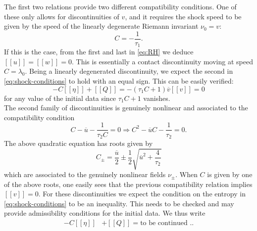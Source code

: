 \documentclass{article}
\theoremstyle{plain}
\theoremstyle{definition}
\numberwithin{theorem}{section}
\newcommand{\todo}[1]{{\Large{\color{red}{#1}}}}
\begin{document}
The first two  relations provide two different compatibility conditions.
One of these only allows for  discontinuities of $v$, and  it requires  the shock speed to be given by the speed of the linearly degenerate Riemann invariant $\nu_0=v$:
\begin{equation}
  C = - \dfrac{1}{\tau_1}.
\end{equation}
 If this is the case,   from the first and last in \eqref{eq:RH}   we deduce $[\![ u]\!] =[\![ w]\!] =0 $. This is essentially a contact discontinuity  moving at speed $C=\lambda_0$.
 Being a linearly degenerated discontinuity, we expect the second in \eqref{eq:shock-conditions} to hold with an equal sign. This can be easily verified:
\begin{equation}
-C [\![\eta ]\!]  +  [\![ Q ]\!] =  - (\tau_1 C + 1) {\overline  v }  [\![ v ]\!] = 0
\end{equation}
for any value of the initial data since $\tau_1 C + 1$ vanishes. \\

The second family of discontinuities is genuinely nonlinear and associated to the compatibility condition
\begin{equation}
C- { \overline u} -\dfrac{1}{\tau_2 C} =0 \Rightarrow   C^2 - { \overline u} C  -\dfrac{1}{\tau_2 } =0.
\end{equation}
The above quadratic equation has    roots given by
\begin{equation}
C_{\pm} = \dfrac{\overline u}{2} \pm \dfrac{1}{2} \sqrt{{\overline u}^2 +\dfrac{4}{\tau_2} }
\end{equation}
which are associated to the genuinely nonlinear fields $\nu_{\pm}$. When $C$ is given by one of the above roots, one easily sees that the previous compatibility relation implies $ [\![ v ]\!]=0$.  For these discontinuities we expect the condition on the entropy in \eqref{eq:shock-conditions} to be an inequality. This needs to be checked and may provide
admissibility conditions for the initial data. We thus write
\begin{equation}
\begin{aligned}
-C [\![\eta ]\!]  & +  [\![ Q ]\!] =  \text{to be continued ..}
\end{aligned}
\end{equation}







\todo{TODO: Check well-posedness results for KdV}
\end{document}

